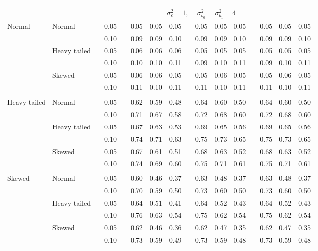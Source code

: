 \documentclass[12pt]{article} %
\begin{document}
\begin{table}[ht]
\begin{scriptsize}
\begin{center}
\begin{tabular}{ll p{.1cm} c p{.1cm} rrr p{.1cm} rrr p{.1cm} rrr}
&&&&&&&&&&&&&&&\\
& && && \multicolumn{9}{c}{$\sigma_{\varepsilon}^2 = 1$, \ \ $\sigma_{b_0}^2 = \sigma_{b_1}^2 = 4$} \\ \cline{6-16}
\rowcolor{gray!20}Normal       & Normal       && 0.05 &&   0.05 & 0.05 & 0.05 && 0.05 & 0.05 & 0.05 && 0.05 & 0.05 & 0.05 \\ 
\rowcolor{gray!20}             &              && 0.10 &&   0.09 & 0.09 & 0.10 && 0.09 & 0.09 & 0.10 && 0.09 & 0.09 & 0.10 \\ 
\rowcolor{gray!20}             & Heavy tailed && 0.05 &&   0.06 & 0.06 & 0.06 && 0.05 & 0.05 & 0.05 && 0.05 & 0.05 & 0.05 \\ 
\rowcolor{gray!20}             &              && 0.10 &&   0.10 & 0.10 & 0.11 && 0.09 & 0.10 & 0.11 && 0.09 & 0.10 & 0.11 \\ 
\rowcolor{gray!20}             & Skewed       && 0.05 &&   0.06 & 0.06 & 0.05 && 0.05 & 0.06 & 0.05 && 0.05 & 0.06 & 0.05 \\ 
\rowcolor{gray!20}             &              && 0.10 &&   0.11 & 0.10 & 0.11 && 0.11 & 0.10 & 0.11 && 0.11 & 0.10 & 0.11 \\ 
             &&&&&&&&&&&&&&&\\
Heavy tailed & Normal       && 0.05 &&   0.62 & 0.59 & 0.48 && 0.64 & 0.60 & 0.50 && 0.64 & 0.60 & 0.50 \\ 
             &              && 0.10 &&   0.71 & 0.67 & 0.58 && 0.72 & 0.68 & 0.60 && 0.72 & 0.68 & 0.60 \\ 
             & Heavy tailed && 0.05 &&   0.67 & 0.63 & 0.53 && 0.69 & 0.65 & 0.56 && 0.69 & 0.65 & 0.56 \\ 
             &              && 0.10 &&   0.74 & 0.71 & 0.63 && 0.75 & 0.73 & 0.65 && 0.75 & 0.73 & 0.65 \\ 
             & Skewed       && 0.05 &&   0.67 & 0.61 & 0.51 && 0.68 & 0.63 & 0.52 && 0.68 & 0.63 & 0.52 \\ 
             &              && 0.10 &&   0.74 & 0.69 & 0.60 && 0.75 & 0.71 & 0.61 && 0.75 & 0.71 & 0.61 \\
             &&&&&&&&&&&&&&&\\ 
Skewed       & Normal       && 0.05 &&   0.60 & 0.46 & 0.37 && 0.63 & 0.48 & 0.37 && 0.63 & 0.48 & 0.37 \\ 
             &              && 0.10 &&   0.70 & 0.59 & 0.50 && 0.73 & 0.60 & 0.50 && 0.73 & 0.60 & 0.50 \\ 
             & Heavy tailed && 0.05 &&   0.64 & 0.51 & 0.41 && 0.64 & 0.52 & 0.43 && 0.64 & 0.52 & 0.43 \\ 
             &              && 0.10 &&   0.76 & 0.63 & 0.54 && 0.75 & 0.62 & 0.54 && 0.75 & 0.62 & 0.54 \\ 
             & Skewed       && 0.05 &&   0.62 & 0.46 & 0.36 && 0.62 & 0.47 & 0.35 && 0.62 & 0.47 & 0.35 \\ 
             &              && 0.10 &&   0.73 & 0.59 & 0.49 && 0.73 & 0.59 & 0.48 && 0.73 & 0.59 & 0.48 \\ 



\end{tabular}
\end{center}
\end{scriptsize}
\end{table}
\end{document}

